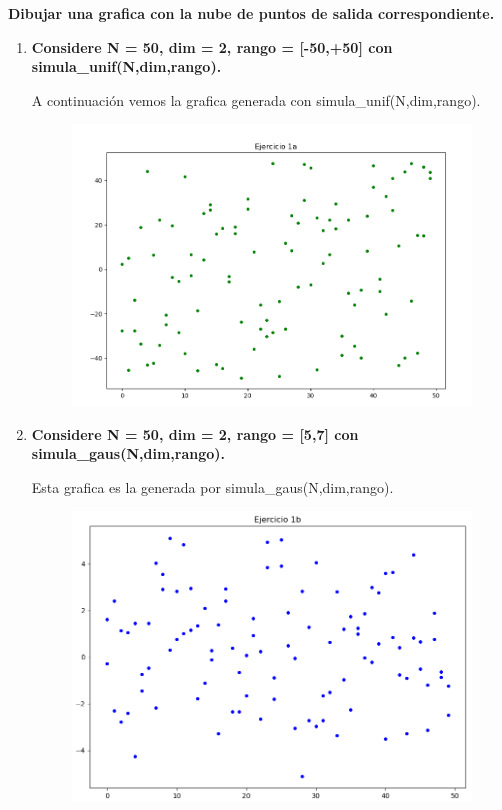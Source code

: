 \documentclass[titlepage]{article}
\begin{document}
	\textbf{Dibujar una grafica con la nube de puntos de salida correspondiente.}
	\begin{enumerate}
		\item 
		\textbf{Considere N = 50, dim = 2, rango = [-50,+50] con simula\_unif(N,dim,rango).}
	
		
		A continuación vemos la grafica generada con simula\_unif(N,dim,rango).
		\begin{figure}[H]
			\centering
			\includegraphics[width=0.7\linewidth]{screenshot001}
			\caption{}
			\label{fig:screenshot001}
		\end{figure}
		
		
		\item 
		\textbf{Considere N = 50, dim = 2, rango = [5,7] con simula\_gaus(N,dim,rango).}

		
		Esta grafica es la generada por simula\_gaus(N,dim,rango).
		
	\begin{figure}[H]
		\centering
		\includegraphics[width=0.7\linewidth]{screenshot002}
		\caption{}
		\label{fig:screenshot002}
	\end{figure}
	
		
		
		 
	\end{enumerate}
\end{document}
